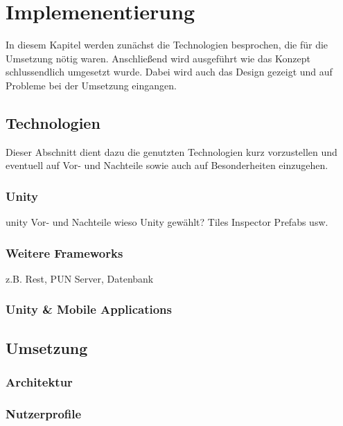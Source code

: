 \chapter{Implemenentierung}
\label{cha:implementierung}
In diesem Kapitel werden zunächst die Technologien besprochen, die für die Umsetzung nötig waren. Anschließend wird ausgeführt wie das Konzept schlussendlich umgesetzt wurde. Dabei wird auch das Design gezeigt und auf Probleme bei der Umsetzung eingangen.

\section{Technologien}
\label{sec:grundlagen:technologien}
Dieser Abschnitt dient dazu die genutzten Technologien kurz vorzustellen und eventuell auf Vor- und Nachteile sowie auch auf Besonderheiten einzugehen.

\subsection{Unity}
\label{subsec:grundlagen:technologien:unity}
unity
Vor- und Nachteile
wieso Unity gewählt?
Tiles 
Inspector
Prefabs
usw.

\subsection{Weitere Frameworks}
\label{subsec:implementierung:technologien:frameworks}
z.B. Rest, PUN Server, Datenbank

\subsection{Unity \& Mobile Applications}
\label{subsec:implementierung:technologien:mobile}

\section{Umsetzung}
\label{sec:grundlagen:umsetzung}

\subsection{Architektur}
\label{subsec:implementierung:umsetung:architektur}

\subsection{Nutzerprofile}
\label{subsec:implementierung:umsetzung:nutzerprofile}

